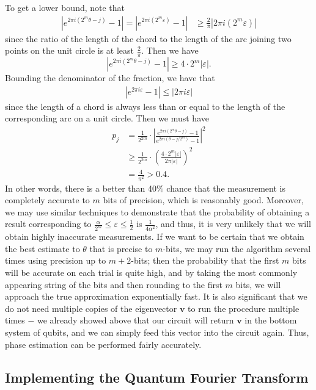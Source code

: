 \documentclass[a4paper]{article}
\newcommand\0{\mathbf{0}}
\newcommand\vv{\mathbf{v}}
\newcommand\<{\langle}
\renewcommand\>{\rangle}
\begin{document}
To get a lower bound, note that 
\begin{align*}
|e^{2\pi i(2^m\theta -j)}-1| = |e^{2\pi i(2^m\varepsilon)}-1|
&\ge \frac{2}{\pi} \left|2\pi i (2^m\varepsilon)\right| 
\end{align*}
since the ratio of the length of the chord to the length of the arc joining two points on the unit circle is at least $\frac{2}{\pi}$. Then we have $$|e^{2\pi i(2^m\theta -j)}-1| \ge 4\cdot 2^m|\varepsilon|.$$
Bounding the denominator of the fraction, we have that 
\begin{align*}
|e^{2\pi i \varepsilon}-1| \le |2\pi i \varepsilon| 
\end{align*}
since the length of a chord is always less than or equal to the length of the corresponding arc on a unit circle. Then we must have 
\begin{align*}
p_j &= \frac{1}{2^{2m}} \cdot \left| \frac{e^{2\pi i(2^m\theta -j)}-1}{e^{2\pi i(\theta-j/2^m)}-1} \right|^2 \\
&\ge \frac{1}{2^{2m}}\cdot \left(\frac{4\cdot 2^m|\varepsilon|}{2\pi |\varepsilon|}\right)^2 \\
& = \frac{4}{\pi^2} > 0.4.
\end{align*}
In other words, there is a better than 40\% chance that the measurement is completely accurate to $m$ bits of precision, which is reasonably good. Moreover, we may use similar techniques to demonstrate that the probability of obtaining a result corresponding to $\frac{\alpha}{2^m} \le \varepsilon \le \frac{1}{2}$ is $\frac{1}{4\alpha^2}$, and thus, it is very unlikely that we will obtain highly inaccurate measurements. If we want to be certain that we obtain the best estimate to $\theta$ that is precise to $m$-bits, we may run the algorithm several times using precision up to $m+2$-bits; then the probability that the first $m$ bits will be accurate on each trial is quite high, and by taking the most commonly appearing string of the bits and then rounding to the first $m$ bits, we will approach the true approximation exponentially fast. It is also significant that we do not need multiple copies of the eigenvector $\vv$ to run the procedure multiple times $-$ we already showed above that our circuit will return $\vv$ in the bottom system of qubits, and we can simply feed this vector into the circuit again. Thus, phase estimation can be performed fairly accurately.

\subsection{Implementing the Quantum Fourier Transform}
\end{document}
